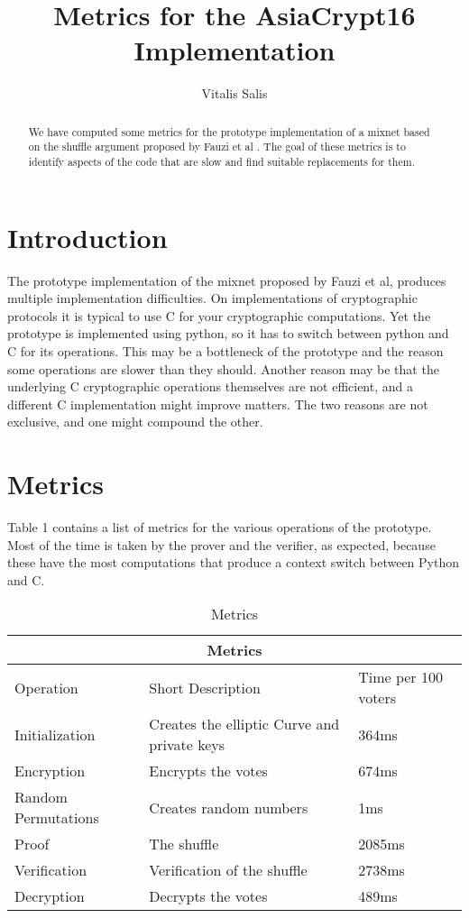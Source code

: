 \documentclass{article}
\date{}
\begin{document}
\title{Metrics for the AsiaCrypt16 Implementation} 

\author{Vitalis Salis}

\maketitle
\begin{abstract}
  We have computed some metrics for the prototype implementation
  \cite{prototype} of a mixnet based on the shuffle argument proposed
  by Fauzi et al \cite{shufflearg}. The goal of these metrics is to
  identify aspects of the code that are slow and find suitable
  replacements for them.
\end{abstract}

\section{Introduction}

The prototype implementation of the mixnet proposed by Fauzi et al,
produces multiple implementation difficulties. On implementations of
cryptographic protocols it is typical to use C for your cryptographic
computations. Yet the prototype is implemented using python, so it has
to switch between python and C for its operations. This may be a
bottleneck of the prototype and the reason some operations are slower
than they should. Another reason may be that the underlying C
cryptographic operations themselves are not efficient, and a different
C implementation might improve matters. The two reasons are not
exclusive, and one might compound the other.

\section{Metrics}

Table 1 contains a list of metrics for the various operations of the
prototype. Most of the time is taken by the prover and the verifier,
as expected, because these have the most computations that produce a
context switch between Python and C.

\begin{table}
\begin{tabular}{ |p{3cm}|p{5cm}|p{3cm}|  }
    \hline
    \multicolumn{3}{|c|}{Metrics}\\
    \hline
    Operation & Short Description & Time per 100 voters\\
    \hline
    Initialization & Creates the elliptic Curve and private keys & 364ms\\
    Encryption & Encrypts the votes & 674ms\\
    Random Permutations & Creates random numbers & 1ms\\
    Proof & The shuffle & 2085ms\\
    Verification & Verification of the shuffle & 2738ms\\
    Decryption & Decrypts the votes & 489ms\\
    \hline
\end{tabular}
\caption{Metrics}
\end{table}
\end{document}
